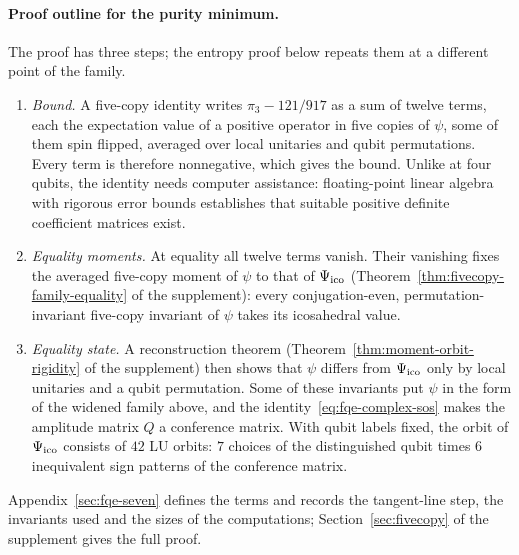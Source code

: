 \paragraph{Proof outline for the purity minimum.} The proof has three steps; the entropy proof below repeats them at a
different point of the family.
\begin{enumerate}
\item \emph{Bound.} A five-copy identity writes $\pi_3-121/917$ as a sum of twelve terms, each the expectation value of a
positive operator in five copies of $\psi$, some of them spin flipped, averaged over local unitaries and qubit
permutations. Every term is therefore nonnegative, which gives the bound. Unlike at four qubits, the identity needs
computer assistance: floating-point linear algebra with rigorous error bounds establishes that suitable positive definite
coefficient matrices exist.
\item \emph{Equality moments.} At equality all twelve terms vanish. Their vanishing fixes the averaged five-copy moment of
$\psi$ to that of $\Psi_{\mathrm{ico}}$ (Theorem~\ref{thm:fivecopy-family-equality} of the supplement): every conjugation-even,
permutation-invariant five-copy invariant of $\psi$ takes its icosahedral value.
\item \emph{Equality state.} A reconstruction theorem (Theorem~\ref{thm:moment-orbit-rigidity} of the supplement) then
shows that $\psi$ differs from $\Psi_{\mathrm{ico}}$ only by local unitaries and a qubit permutation. Some of these invariants put
$\psi$ in the form of the widened family above, and the identity~\eqref{eq:fqe-complex-sos}
makes the amplitude matrix $Q$ a conference matrix.
With qubit labels fixed, the orbit of $\Psi_{\mathrm{ico}}$ consists of $42$ LU orbits: $7$ choices of the distinguished qubit times
$6$ inequivalent sign patterns of the conference matrix.
\end{enumerate}
Appendix~\ref{sec:fqe-seven} defines the terms and records the tangent-line step, the invariants used and the sizes of the
computations; Section~\ref{sec:fivecopy} of the supplement gives the full proof.

